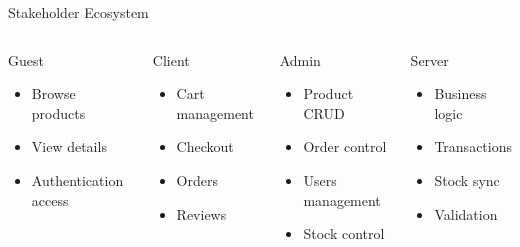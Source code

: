 \documentclass[10pt]{beamer}
\begin{document}
\begin{frame}{Stakeholder Ecosystem}

\begin{columns}[T]

\begin{exampleblock}{Guest}
\scriptsize
\begin{itemize}
\item Browse products
\item View details
\item Authentication access
\end{itemize}
\end{exampleblock}

\begin{exampleblock}{Client}
\scriptsize
\begin{itemize}
\item Cart management
\item Checkout
\item Orders
\item Reviews
\end{itemize}
\end{exampleblock}

\begin{alertblock}{Admin}
\scriptsize
\begin{itemize}
\item Product CRUD
\item Order control
\item Users management
\item Stock control
\end{itemize}
\end{alertblock}

\begin{block}{Server}
\scriptsize
\begin{itemize}
\item Business logic
\item Transactions
\item Stock sync
\item Validation
\end{itemize}
\end{block}

\end{columns}

\end{frame}
\end{document}
